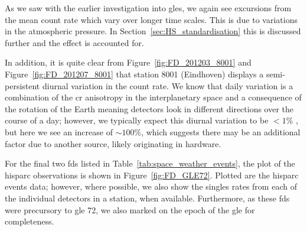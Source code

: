 As we saw with the earlier investigation into \glspl{gle}, we again see excursions from the mean count rate which vary over longer time scales. This is due to variations in the atmospheric pressure. In Section~\ref{sec:HS_standardisation} this is discussed further and the effect is accounted for.

In addition, it is quite clear from Figure~\ref{fig:FD_201203_8001} and Figure~\ref{fig:FD_201207_8001} that station 8001 (Eindhoven) displays a semi-persistent diurnal variation in the count rate. We know that daily variation is a combination of the \gls{cr} anisotropy in the interplanetary space and a consequence of the rotation of the Earth meaning detectors look in different directions over the course of a day; however, we typically expect this diurnal variation to be $<1\%$ \citep{mishra_study_2007, mishra_cosmic_2008, dubey_cosmic_2016, thomas_decadal_2017}, but here we see an increase of $\sim 100\%$, which suggests there may be an additional factor due to another source, likely originating in hardware.

For the final two \glspl{fd} listed in Table~\ref{tab:space_weather_events}, the plot of the \gls{hisparc} observations is shown in Figure~\ref{fig:FD_GLE72}. Plotted are the \gls{hisparc} events data; however, where possible, we also show the singles rates from each of the individual detectors in a station, when available. Furthermore, as these \glspl{fd} were precursory to \gls{gle} 72, we also marked on the epoch of the \gls{gle} for completeness.

